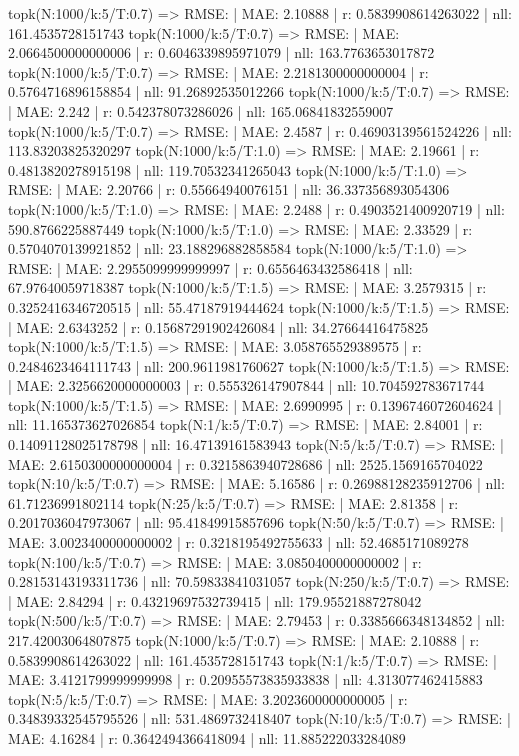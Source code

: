 topk(N:1000/k:5/T:0.7) => RMSE: | MAE: 2.10888 | r: 0.5839908614263022 | nll: 161.4535728151743
topk(N:1000/k:5/T:0.7) => RMSE: | MAE: 2.0664500000000006 | r: 0.6046339895971079 | nll: 163.7763653017872
topk(N:1000/k:5/T:0.7) => RMSE: | MAE: 2.2181300000000004 | r: 0.5764716896158854 | nll: 91.26892535012266
topk(N:1000/k:5/T:0.7) => RMSE: | MAE: 2.242 | r: 0.542378073286026 | nll: 165.06841832559007
topk(N:1000/k:5/T:0.7) => RMSE: | MAE: 2.4587 | r: 0.46903139561524226 | nll: 113.83203825320297
topk(N:1000/k:5/T:1.0) => RMSE: | MAE: 2.19661 | r: 0.4813820278915198 | nll: 119.70532341265043
topk(N:1000/k:5/T:1.0) => RMSE: | MAE: 2.20766 | r: 0.55664940076151 | nll: 36.337356893054306
topk(N:1000/k:5/T:1.0) => RMSE: | MAE: 2.2488 | r: 0.4903521400920719 | nll: 590.8766225887449
topk(N:1000/k:5/T:1.0) => RMSE: | MAE: 2.33529 | r: 0.5704070139921852 | nll: 23.188296882858584
topk(N:1000/k:5/T:1.0) => RMSE: | MAE: 2.2955099999999997 | r: 0.6556463432586418 | nll: 67.97640059718387
topk(N:1000/k:5/T:1.5) => RMSE: | MAE: 3.2579315 | r: 0.3252416346720515 | nll: 55.47187919444624
topk(N:1000/k:5/T:1.5) => RMSE: | MAE: 2.6343252 | r: 0.15687291902426084 | nll: 34.27664416475825
topk(N:1000/k:5/T:1.5) => RMSE: | MAE: 3.058765529389575 | r: 0.2484623464111743 | nll: 200.9611981760627
topk(N:1000/k:5/T:1.5) => RMSE: | MAE: 2.3256620000000003 | r: 0.555326147907844 | nll: 10.704592783671744
topk(N:1000/k:5/T:1.5) => RMSE: | MAE: 2.6990995 | r: 0.1396746072604624 | nll: 11.165373627026854
topk(N:1/k:5/T:0.7) => RMSE: | MAE: 2.84001 | r: 0.14091128025178798 | nll: 16.47139161583943
topk(N:5/k:5/T:0.7) => RMSE: | MAE: 2.6150300000000004 | r: 0.3215863940728686 | nll: 2525.1569165704022
topk(N:10/k:5/T:0.7) => RMSE: | MAE: 5.16586 | r: 0.26988128235912706 | nll: 61.71236991802114
topk(N:25/k:5/T:0.7) => RMSE: | MAE: 2.81358 | r: 0.2017036047973067 | nll: 95.41849915857696
topk(N:50/k:5/T:0.7) => RMSE: | MAE: 3.0023400000000002 | r: 0.3218195492755633 | nll: 52.4685171089278
topk(N:100/k:5/T:0.7) => RMSE: | MAE: 3.0850400000000002 | r: 0.28153143193311736 | nll: 70.59833841031057
topk(N:250/k:5/T:0.7) => RMSE: | MAE: 2.84294 | r: 0.43219697532739415 | nll: 179.95521887278042
topk(N:500/k:5/T:0.7) => RMSE: | MAE: 2.79453 | r: 0.3385666348134852 | nll: 217.42003064807875
topk(N:1000/k:5/T:0.7) => RMSE: | MAE: 2.10888 | r: 0.5839908614263022 | nll: 161.4535728151743
topk(N:1/k:5/T:0.7) => RMSE: | MAE: 3.4121799999999998 | r: 0.20955573835933838 | nll: 4.313077462415883
topk(N:5/k:5/T:0.7) => RMSE: | MAE: 3.2023600000000005 | r: 0.34839332545795526 | nll: 531.4869732418407
topk(N:10/k:5/T:0.7) => RMSE: | MAE: 4.16284 | r: 0.3642494366418094 | nll: 11.885222033284089
